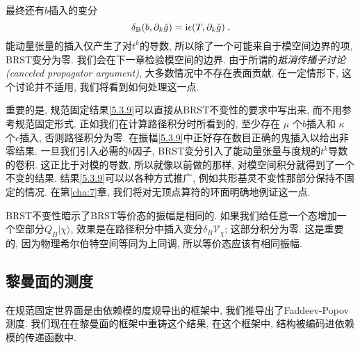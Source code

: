 最终还有$b$插入的变分
\begin{equation}
	\delta_{\mathrm{B}}(b, \partial_{k} \hat{g})=\mathrm{i} \epsilon(T, \partial_{k} \hat{g}) \:. \label{5.4.6}
\end{equation}
能动量张量的插入仅产生了对$t^{k}$的导数, 所以除了一个可能来自于模空间边界的项, BRST变分为零. 我们会在下一章检验模空间的边界. 
由于所谓的\emph{抵消传播子讨论(canceled propagator argument)}, 大多数情况中不存在表面贡献. 在一定情形下, 这个讨论并不适用, 我们将看到如何处理这一点.

重要的是, 规范固定结果\eqref{5.3.9}可以直接从BRST不变性的要求中写出来, 而不用参考规范固定形式. 正如我们在计算路径积分时所看到的, 
至少存在 $\mu $ 个$b$插入和 $\kappa $ 个$c$插入, 否则路径积分为零. 在振幅\eqref{5.3.9}中正好存在数目正确的鬼插入以给出非零结果. 
一旦我们引入必需的$b$因子, BRST变分引入了能动量张量与度规的$t^{k}$导数的卷积. 这正比于对模的导数, 所以就像以前做的那样, 对模空间积分就得到了一个不变的结果. 
结果\eqref{5.3.9}可以以各种方式推广, 例如共形基灵不变性那部分保持不固定的情况. 在第\ref{cha:7}章, 我们将对无顶点算符的环面明确地例证这一点.

BRST不变性暗示了BRST等价态的振幅是相同的. 如果我们给任意一个态增加一个空部分$Q_{B}|\chi\rangle$, 
效果是在路径积分中插入变分$\delta_{B} \mathscr{V}_{\chi}$; 这部分积分为零. 
这是重要的, 因为物理希尔伯特空间等同为上同调, 所以等价态应该有相同振幅.

\subsection*{黎曼面的测度}
在规范固定世界面是由依赖模的度规导出的框架中, 我们推导出了Faddeev-Popov测度. 
我们现在在黎曼面的框架中重铸这个结果, 在这个框架中, 结构被编码进依赖模的传递函数中.

